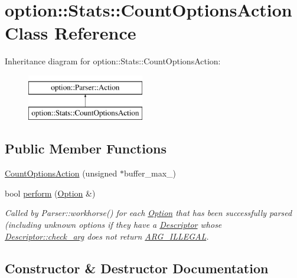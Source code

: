 \hypertarget{classoption_1_1_stats_1_1_count_options_action}{}\section{option\+:\+:Stats\+:\+:Count\+Options\+Action Class Reference}
\label{classoption_1_1_stats_1_1_count_options_action}
Inheritance diagram for option\+:\+:Stats\+:\+:Count\+Options\+Action\+:\begin{figure}[H]
\begin{center}
\leavevmode
\includegraphics[height=2.000000cm]{classoption_1_1_stats_1_1_count_options_action}
\end{center}
\end{figure}
\subsection*{Public Member Functions}
\begin{DoxyCompactItemize}
\item 
\hyperlink{classoption_1_1_stats_1_1_count_options_action_a24a38b87ad129b0e12660bd2019ba284}{Count\+Options\+Action} (unsigned $\ast$buffer\+\_\+max\+\_\+)
\item 
bool \hyperlink{classoption_1_1_stats_1_1_count_options_action_a29ab8a68d0a30736b99b4d2e5dece489}{perform} (\hyperlink{classoption_1_1_option}{Option} \&)
\begin{DoxyCompactList}\small\item\em Called by Parser\+::workhorse() for each \hyperlink{classoption_1_1_option}{Option} that has been successfully parsed (including unknown options if they have a \hyperlink{structoption_1_1_descriptor}{Descriptor} whose \hyperlink{structoption_1_1_descriptor_aa5d675dba0214a4abd73007ff163cc67}{Descriptor\+::check\+\_\+arg} does not return \hyperlink{namespaceoption_aee8c76a07877335762631491e7a5a1a9a9528e32563b795bd2930b12d0a5e382d}{A\+R\+G\+\_\+\+I\+L\+L\+E\+G\+AL}. \end{DoxyCompactList}\end{DoxyCompactItemize}


\subsection{Constructor \& Destructor Documentation}
\mbox{\label{classoption_1_1_stats_1_1_count_options_action_a24a38b87ad129b0e12660bd2019ba284}} 
